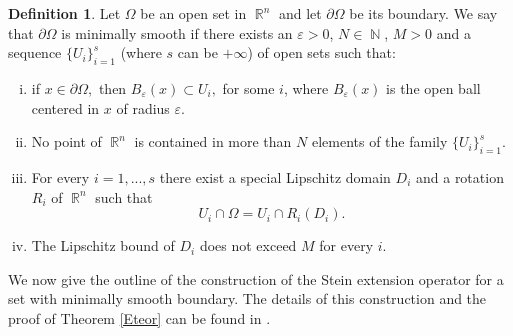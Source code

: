 \documentclass[12pt]{article}
\theoremstyle{definition}
\newtheorem{definition}{Definition}
\DeclareMathOperator\rr{\mathbb{R}}
\DeclareMathOperator\nn{\mathbb{N}}
\begin{document}
\begin{definition}\label{minsmooth}
Let $\Omega$ be an open set in $\rr^n$ and let $\partial \Omega$ be its boundary. We say that $\partial \Omega$ is minimally smooth if there exists an $\varepsilon >0$, $N \in \nn$, $M>0$ and a sequence $\{U_i\}_{i=1}^s$ (where $s$ can be $+\infty$) of open sets such that:
\begin{enumerate}[i)]
\item if $x \in \partial \Omega,$ then $B_\varepsilon(x) \subset U_i,$ for some $i$, where $B_\varepsilon(x)$ is the open ball centered in $x$ of radius $\varepsilon.$
\item No point of $\rr^n$ is contained in more than $N$ elements of the family $\{U_i\}_{i=1}^s.$
\item For every $i=1,...,s$ there exist a special Lipschitz domain $D_i$ and a rotation $R_i$ of $\rr^n$ such that
\[ U_i\cap \Omega = U_i \cap R_i(D_i).\]
\item The Lipschitz bound of $D_i$ does not exceed $M$ for every $i$. 
\end{enumerate}
\end{definition}

We now give the outline of the construction of the Stein extension operator for a set with minimally smooth boundary. The details of this construction and the proof of Theorem \ref{Eteor} can be found in \cite{stein}. 
\end{document}
